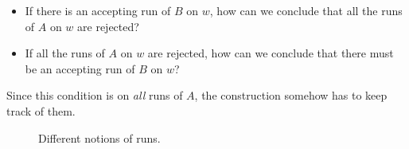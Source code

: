 \begin{itemize}
\item If there is an accepting run of $B$ on $w$, how can we conclude that all the runs of $A$ on $w$ are rejected?
\item If all the runs of $A$ on $w$ are rejected, how can we conclude that there must be an accepting run of $B$ on $w$?
\end{itemize}


Since this condition is on \emph{all} runs of $A$, the construction somehow has to keep track of them. 
\label{lower_part:intuition}
\begin{figure}
\begin{center}
\RunTypes
\caption{Different notions of runs.}
\label{run_types}
\end{center}
\end{figure}



